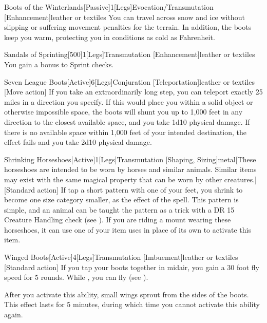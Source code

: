         \begin{magicitemdef}{Boots of the Winterlands}[Passive]{1}[Legs]{Evocation/Transmutation [Enhancement]}{leather or textiles}
             You can travel across snow and ice without slipping or suffering movement penalties for the terrain.
            In addition, the boots keep you warm, protecting you in conditions as cold as  Fahrenheit.
        \end{magicitemdef}

        \begin{magicitemdef}{Sandals of Sprinting}[500]{1}[Legs]{Transmutation [Enhancement]}{leather or textiles}
             You gain a  bonus to Sprint checks.
        \end{magicitemdef}

        \begin{magicitemdef}{Seven League Boots}[Active]{6}[Legs]{Conjuration [Teleportation]}{leather or textiles}
            [Move action] If you take an extraordinarily long step, you can teleport exactly 25 miles in a direction you specify.
            If this would place you within a solid object or otherwise impossible space, the boots will shunt you up to 1,000 feet in any direction to the closest available space, and you take 1d10 physical damage.
            If there is no available space within 1,000 feet of your intended destination, the effect fails and you take 2d10 physical damage.
        \end{magicitemdef}

        \begin{magicitemdef}{Shrinking Horseshoes}[Active]{1}[Legs]{Transmutation [Shaping, Sizing]}{metal}[These horseshoes are intended to be worn by horses and similar animals. Similar items may exist with the same magical property that can be worn by other creatures.]
            [Standard action] If tap a short pattern with one of your feet, you shrink to become one size category smaller, as the effect of the  spell.
            This pattern is simple, and an animal can be taught the pattern as a trick with a DR 15 Creature Handling check (see ).
            If you are riding a mount wearing these horseshoes, it can use one of your item uses in place of its own to activate this item.
        \end{magicitemdef}

        \begin{magicitemdef}{Winged Boots}[Active]{4}[Legs]{Transmutation [Imbuement]}{leather or textiles}
            [Standard action] If you tap your boots together in midair, you gain a 30 foot fly speed for 5 rounds.
            While \unencumbered, you can fly (see ).

            After you activate this ability, small wings sprout from the sides of the boots.
            This effect lasts for 5 minutes, during which time you cannot activate this ability again.
        \end{magicitemdef}

